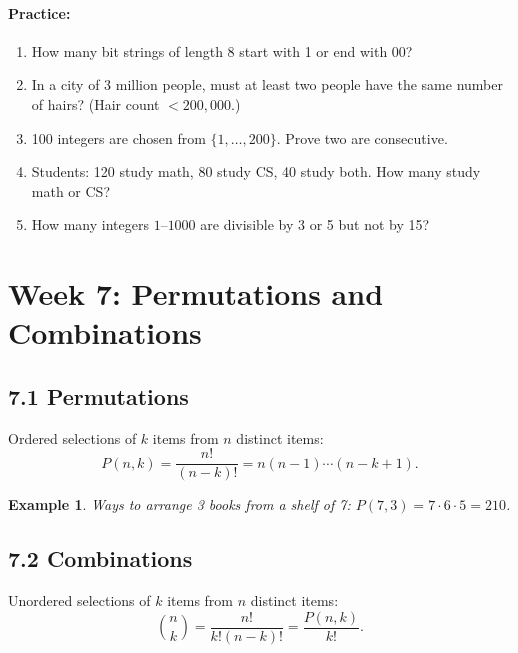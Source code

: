 \documentclass[11pt]{article}
\newtheorem{example}[definition]{Example}
\newenvironment{practice}{\paragraph*{\textbf{Practice:}}}{}
\begin{document}
\begin{practice}
\begin{enumerate}[nosep,label=\arabic*.]
  \item How many bit strings of length 8 start with 1 or end with 00?
  \item In a city of 3 million people, must at least two people have the same number of hairs? (Hair count $<200{,}000$.)
  \item 100 integers are chosen from $\{1,\ldots,200\}$. Prove two are consecutive.
  \item Students: 120 study math, 80 study CS, 40 study both. How many study math or CS?
  \item How many integers $1$–$1000$ are divisible by 3 or 5 but not by 15?
\end{enumerate}
\end{practice}

\newpage
\section{Week 7: Permutations and Combinations}
\setcounter{definition}{0}

\subsection*{7.1 Permutations}

\begin{tcolorbox}[keybox={Permutations $P(n,k)$}]
Ordered selections of $k$ items from $n$ distinct items:
\[P(n,k)=\frac{n!}{(n-k)!}=n(n-1)\cdots(n-k+1).\]
\end{tcolorbox}

\begin{example}
Ways to arrange 3 books from a shelf of 7: $P(7,3)=7\cdot6\cdot5=210$.
\end{example}

\subsection*{7.2 Combinations}

\begin{tcolorbox}[keybox={Combinations $C(n,k)=\binom{n}{k}$}]
Unordered selections of $k$ items from $n$ distinct items:
\[\binom{n}{k}=\frac{n!}{k!(n-k)!}=\frac{P(n,k)}{k!}.\]
\end{tcolorbox}
\end{document}
